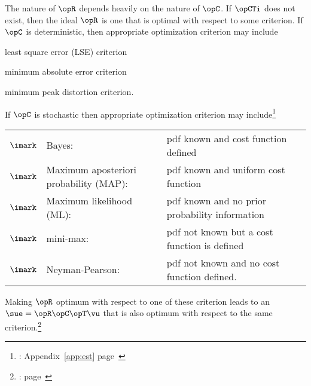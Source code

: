 The nature of $\opR$ depends heavily on the nature of $\opC$.
If $\opCTi$ does not exist,
then the ideal $\opR$ is one that is optimal with respect to some criterion.
If $\opC$ is deterministic,
then appropriate optimization criterion may include
\begin{liste}
   \item least square error (LSE) criterion
   \item minimum absolute error criterion
   \item minimum peak distortion criterion.
\end{liste}
If $\opC$ is stochastic
then appropriate optimization criterion may include\footnote{
  : Appendix~\ref{app:est} page~\pageref{app:est}
  }

\begin{tabular}{llll}
   $\imark$ & Bayes:                                  & pdf known and cost function defined \\
   $\imark$ & Maximum aposteriori probability (MAP):  & pdf known and uniform cost function \\
   $\imark$ & Maximum likelihood (ML):                & pdf known and no prior probability information\\
   $\imark$ & mini-max:                               & pdf not known but a cost function is defined \\
   $\imark$ & Neyman-Pearson:                         & pdf not known and no cost function defined.
\end{tabular}

Making $\opR$ optimum with respect to one of these criterion leads to
an  $\sue = \opR\opC\opT\vu$ that is also optimum
with respect to the same criterion.\footnote{
   :
    page~\pageref{def:ML}
   }
\\

